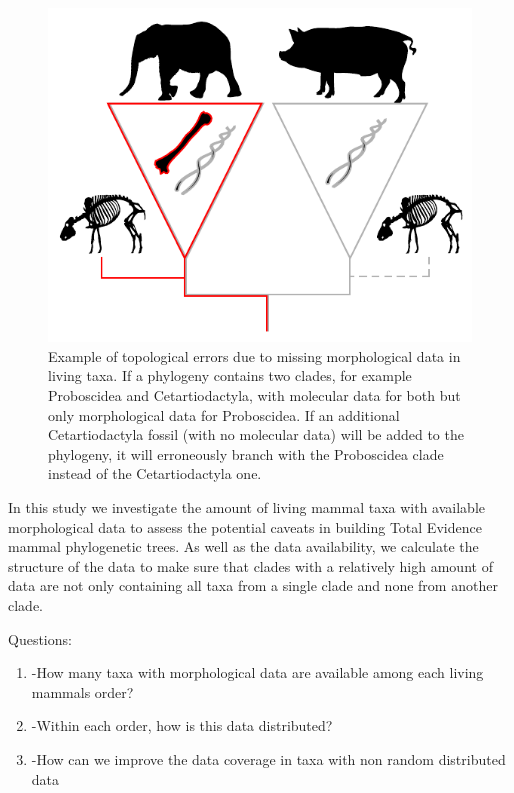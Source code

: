 \documentclass[12pt,letterpaper]{article}
\begin{document}
\begin{figure}[!htbp]
\centering
    \includegraphics[width=1\textwidth]{MissingDataFigure.pdf}
\caption{Example of topological errors due to missing morphological data in living taxa. If a phylogeny contains two clades, for example Proboscidea and Cetartiodactyla, with molecular data for both but only morphological data for Proboscidea. If an additional Cetartiodactyla fossil (with no molecular data) will be added to the phylogeny, it will erroneously branch with the Proboscidea clade instead of the Cetartiodactyla one.}
\label{Figure_missing_data_problem}
\end{figure}

In this study we investigate the amount of living mammal taxa with available morphological data to assess the potential caveats in building Total Evidence mammal phylogenetic trees. As well as the data availability, we calculate the structure of the data to make sure that clades with a relatively high amount of data are not only containing all taxa from a single clade and none from another clade.

Questions:
\begin{enumerate}
\item{-How many taxa with morphological data are available among each living mammals order?}
\item{-Within each order, how is this data distributed?}
\item{-How can we improve the data coverage in taxa with non random distributed data}
\end{enumerate}
\end{document}
